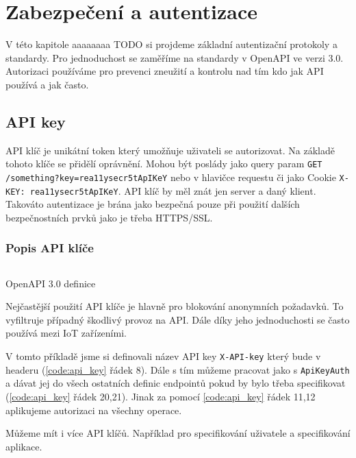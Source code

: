\chapter{Zabezpečení a autentizace}
V této kapitole aaaaaaaa TODO si projdeme základní autentizační protokoly a standardy.
Pro jednoduchost se zaměříme na standardy v OpenAPI ve verzi 3.0.
Autorizaci používáme pro prevenci zneužití a kontrolu nad tím kdo jak API používá a jak často.

\section{API key}
API klíč je unikátní token který umožňuje uživateli se autorizovat. Na základě tohoto klíče se přidělí oprávnění. Mohou být poslády jako query param  \texttt{GET /something?key=rea11ysecr5tApIKeY} nebo v hlavičce requestu či jako Cookie \texttt{X-KEY: rea11ysecr5tApIKeY}. API klíč by měl znát jen server a daný klient. Takováto autentizace je brána jako bezpečná pouze při použití dalších bezpečnostních prvků jako je třeba HTTPS/SSL.

\subsection{Popis API klíče}
\begin{listing}[ht]
    \inputminted[]{yaml}{resources/code/security/openapi-key.yml}
    \caption{OpenAPI 3.0 definice}
    \label{code:api_key}
\end{listing}

Nejčastější použití API klíče je hlavně pro blokování anonymních požadavků. To vyfiltruje případný škodlivý provoz na API. Dále díky jeho jednoduchosti se často používá mezi IoT zařízeními.

V tomto příkladě jsme si definovali název API key \texttt{X-API-key} který bude v headeru (\ref{code:api_key} řádek 8). Dále s tím můžeme pracovat jako s \texttt{ApiKeyAuth} a dávat jej do všech ostatních definic endpointů pokud by bylo třeba specifikovat (\ref{code:api_key} řádek 20,21). Jinak za pomocí \ref{code:api_key} řádek 11,12 aplikujeme autorizaci na všechny operace.


Můžeme mít i více API klíčů. Například pro specifikování uživatele a specifikování aplikace.

